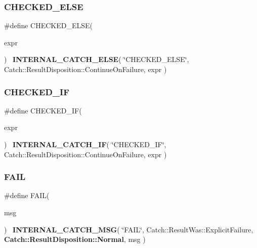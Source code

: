 \subsubsection{C\+H\+E\+C\+K\+E\+D\+\_\+\+E\+L\+SE}
{\footnotesize\ttfamily \#define C\+H\+E\+C\+K\+E\+D\+\_\+\+E\+L\+SE(\begin{DoxyParamCaption}\item[{}]{expr }\end{DoxyParamCaption})~\textbf{ I\+N\+T\+E\+R\+N\+A\+L\+\_\+\+C\+A\+T\+C\+H\+\_\+\+E\+L\+SE}( \char`\"{}C\+H\+E\+C\+K\+E\+D\+\_\+\+E\+L\+SE\char`\"{}, Catch\+::\+Result\+Disposition\+::\+Continue\+On\+Failure, expr )}

\mbox{\label{catch_8hpp_acf5256555bbf08fa5105f50242111dbb}} 
\subsubsection{C\+H\+E\+C\+K\+E\+D\+\_\+\+IF}
{\footnotesize\ttfamily \#define C\+H\+E\+C\+K\+E\+D\+\_\+\+IF(\begin{DoxyParamCaption}\item[{}]{expr }\end{DoxyParamCaption})~\textbf{ I\+N\+T\+E\+R\+N\+A\+L\+\_\+\+C\+A\+T\+C\+H\+\_\+\+IF}( \char`\"{}C\+H\+E\+C\+K\+E\+D\+\_\+\+IF\char`\"{}, Catch\+::\+Result\+Disposition\+::\+Continue\+On\+Failure, expr )}

\mbox{\label{catch_8hpp_a292ad803e75cf5ca00676b8595513ace}} 
\subsubsection{F\+A\+IL}
{\footnotesize\ttfamily \#define F\+A\+IL(\begin{DoxyParamCaption}\item[{}]{msg }\end{DoxyParamCaption})~\textbf{ I\+N\+T\+E\+R\+N\+A\+L\+\_\+\+C\+A\+T\+C\+H\+\_\+\+M\+SG}( \char`\"{}F\+A\+IL\char`\"{}, Catch\+::\+Result\+Was\+::\+Explicit\+Failure, \textbf{ Catch\+::\+Result\+Disposition\+::\+Normal}, msg )}

\mbox{\label{catch_8hpp_a65436c6b2a78e5a775090dd005c93a78}} 
